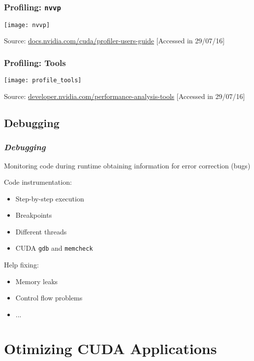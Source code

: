 \documentclass[10pt, compress]{beamer}
\begin{document}
\begin{frame}
    \frametitle{Profiling: \texttt{nvvp}}
    \centering
    \texttt{[image: nvvp]}

    \vfill
    \tiny{Source: \url{docs.nvidia.com/cuda/profiler-users-guide} [Accessed in 29/07/16]}
\end{frame}

\begin{frame}
    \frametitle{Profiling: Tools}
    \centering
    \texttt{[image: profile\_tools]}

    \vfill
    \tiny{Source: \url{developer.nvidia.com/performance-analysis-tools} [Accessed in 29/07/16]}
\end{frame}

\subsection{Debugging}

\begin{frame}
    \frametitle{\textit{Debugging}}
    Monitoring code during \alert{runtime}
    obtaining information for \alert{error correction} (\alert{bugs})


    Code \alert{instrumentation}:
    \begin{itemize}
        \item \alert{Step-by-step} execution

        \item \alert{Breakpoints}

        \item Different \alert{threads}

        \item CUDA \texttt{\alert{gdb}} and \texttt{\alert{memcheck}}
    \end{itemize}


    Help fixing:
    \begin{itemize}
        \item Memory \alert{leaks}

        \item \alert{Control flow} problems

        \item ...
    \end{itemize}
\end{frame}

\section{Otimizing CUDA Applications}
\end{document}
